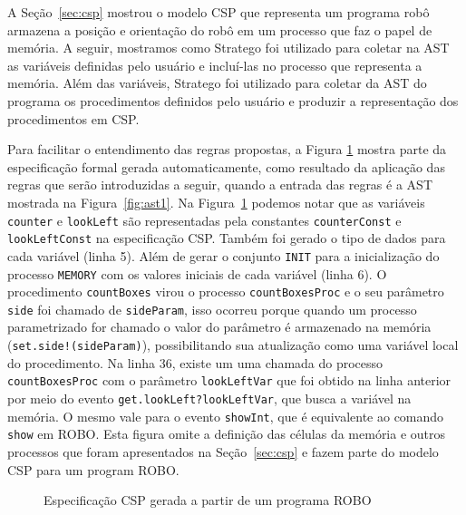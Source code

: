 A Seção~\ref{sec:csp} mostrou o modelo CSP que representa um programa robô armazena a posição e orientação do robô em um processo que faz o papel de memória. A seguir, mostramos como Stratego foi utilizado para coletar na AST as variáveis definidas pelo usuário e incluí-las no processo que representa a memória. Além das variáveis, Stratego foi utilizado para coletar da AST do programa os procedimentos definidos pelo usuário e produzir a representação dos procedimentos em CSP.

Para facilitar o entendimento das regras propostas, a Figura \ref{fig:progcsp} mostra parte da especificação formal gerada automaticamente, como resultado da aplicação das regras que serão introduzidas a seguir, quando a entrada das regras é a AST mostrada na Figura~\ref{fig:ast1}. 
Na Figura~\ref{fig:progcsp} podemos notar que as variáveis \texttt{counter} e \texttt{lookLeft} são representadas pela constantes \texttt{counterConst} e \texttt{lookLeftConst} na especificação CSP. Também foi gerado o tipo de dados para cada variável (linha 5). Além de gerar o conjunto \texttt{INIT} para a inicialização do processo \texttt{MEMORY} com os valores iniciais de cada variável (linha 6). O procedimento \texttt{countBoxes} virou o processo \texttt{countBoxesProc} e o seu parâmetro \texttt{side} foi chamado de \texttt{sideParam}, isso ocorreu porque quando um processo parametrizado for chamado o valor do parâmetro é armazenado na memória (\texttt{set.side!(sideParam)}), possibilitando sua atualização como uma variável local do procedimento. Na linha 36, existe um uma chamada do processo \texttt{countBoxesProc} com o parâmetro \texttt{lookLeftVar} que foi obtido na linha anterior por meio do evento \texttt{get.lookLeft?lookLeftVar}, que busca a variável na memória. O mesmo vale para o evento \texttt{showInt}, que é equivalente ao comando \texttt{show} em ROBO. Esta figura omite a definição das células da memória e outros processos que foram apresentados na Seção~\ref{sec:csp} e fazem parte do modelo CSP para um program ROBO.  

\begin{figure}[!h]
\centering
\caption{Especificação CSP gerada a partir de um programa ROBO}

\label{fig:progcsp}
\end{figure}

